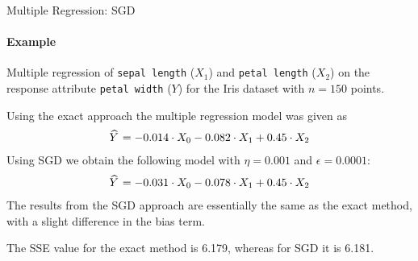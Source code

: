 %
%
%
%
%
%
\begin{frame}{Multiple Regression: SGD}
\framesubtitle{Example}
    Multiple regression of 
{\tt sepal length} ($X_1$) and {\tt petal
    length} ($X_2$) on the response attribute {\tt petal width} ($Y$)
for the Iris dataset with $n=150$ points. 

\medskip
    
    Using
    the exact approach the multiple regression model was given as
    \begin{align*}
        \mkern 1.5mu\widehat{\mkern-1.5muY}\mkern 1.5mu = -0.014 \cdot X_0 -0.082 \cdot X_1 + 0.45 \cdot X_2 \end{align*}
    Using SGD we obtain the following model with
    $\eta=0.001$ and $\epsilon=0.0001$:
    \begin{align*}
        \mkern 1.5mu\widehat{\mkern-1.5muY}\mkern 1.5mu = -0.031 \cdot X_0 -0.078 \cdot X_1 + 0.45 \cdot X_2
    \end{align*}
    The results from the SGD approach are essentially the same as the
    exact method, with a slight difference in the bias term.

    \medskip

    The SSE value for the exact
    method is 6.179, whereas for SGD it is 6.181.
\end{frame}
%
%

